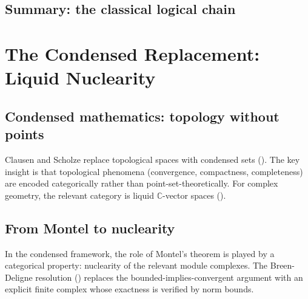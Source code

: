 \documentclass[11pt,a4paper]{article}
\theoremstyle{plain}
\theoremstyle{definition}
\newcommand{\CLASS}{\textsf{CLASS}}
\newcommand{\C}{\mathbb{C}}
\begin{document}
\subsection{Summary: the classical logical chain}

\begin{center}
\end{center}

\section{The Condensed Replacement: Liquid Nuclearity}
\label{sec:condensed}

\subsection{Condensed mathematics: topology without points}

Clausen and Scholze \cite{ClausenScholze2020} replace topological spaces with condensed sets ().
The key insight is that topological phenomena (convergence, compactness, completeness) are encoded categorically rather than point-set-theoretically.
For complex geometry, the relevant category is liquid $\C$-vector spaces ().

\subsection{From Montel to nuclearity}

In the condensed framework, the role of Montel's theorem is played by a categorical property: nuclearity of the relevant module complexes.
The Breen-Deligne resolution () replaces the bounded-implies-convergent argument with an explicit finite complex whose exactness is verified by norm bounds.
\end{document}

